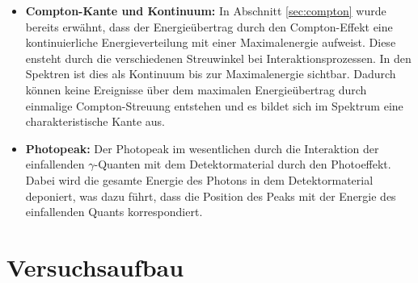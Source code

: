 \documentclass[11pt, a4paper]{article}
\numberwithin{equation}{section}
\begin{document}
\begin{itemize}
	\item \textbf{Compton-Kante und Kontinuum:}
	In Abschnitt \ref{sec:compton} wurde bereits erwähnt, dass der Energieübertrag durch den Compton-Effekt eine kontinuierliche Energieverteilung mit einer Maximalenergie aufweist.
	Diese ensteht durch die verschiedenen Streuwinkel bei Interaktionsprozessen.
	In den Spektren ist dies als Kontinuum bis zur Maximalenergie sichtbar.
	Dadurch können keine Ereignisse über dem maximalen Energieübertrag durch einmalige Compton-Streuung entstehen und es bildet sich im Spektrum eine charakteristische Kante aus.	
	
	\item \textbf{Photopeak:}
	Der Photopeak im wesentlichen durch die Interaktion der einfallenden $\gamma$-Quanten mit dem Detektormaterial durch den Photoeffekt.
	Dabei wird die gesamte Energie des Photons in dem Detektormaterial deponiert, was dazu führt, dass die Position des Peaks mit der Energie des einfallenden Quants korrespondiert.
	
\end{itemize}

\section{Versuchsaufbau}
\end{document}
